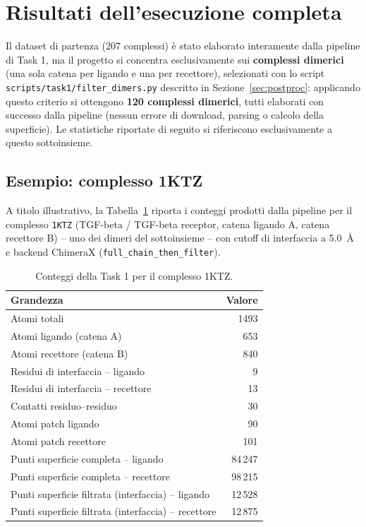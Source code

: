 \documentclass[11pt,a4paper]{article}
\begin{document}
\section{Risultati dell'esecuzione completa}
\label{sec:results}

Il dataset di partenza (207 complessi) è stato elaborato interamente dalla pipeline di Task 1, ma il progetto si concentra esclusivamente sui \textbf{complessi dimerici} (una sola catena per ligando e una per recettore), selezionati con lo script \texttt{scripts/task1/filter\_dimers.py} descritto in Sezione~\ref{sec:postproc}: applicando questo criterio si ottengono \textbf{120 complessi dimerici}, tutti elaborati con successo dalla pipeline (nessun errore di download, parsing o calcolo della superficie). Le statistiche riportate di seguito si riferiscono esclusivamente a questo sottoinsieme.

\subsection{Esempio: complesso 1KTZ}
A titolo illustrativo, la Tabella~\ref{tab:1ktz} riporta i conteggi prodotti dalla pipeline per il complesso \texttt{1KTZ} (TGF-beta / TGF-beta receptor, catena ligando A, catena recettore B) -- uno dei dimeri del sottoinsieme -- con cutoff di interfaccia a 5.0~\r{A} e backend ChimeraX (\texttt{full\_chain\_then\_filter}).

\begin{table}[h]
\centering
\caption{Conteggi della Task 1 per il complesso 1KTZ.}
\label{tab:1ktz}
\begin{tabular}{lr}
\toprule
Grandezza & Valore \\
\midrule
Atomi totali & 1493 \\
Atomi ligando (catena A) & 653 \\
Atomi recettore (catena B) & 840 \\
Residui di interfaccia -- ligando & 9 \\
Residui di interfaccia -- recettore & 13 \\
Contatti residuo--residuo & 30 \\
Atomi patch ligando & 90 \\
Atomi patch recettore & 101 \\
Punti superficie completa -- ligando & 84\,247 \\
Punti superficie completa -- recettore & 98\,215 \\
Punti superficie filtrata (interfaccia) -- ligando & 12\,528 \\
Punti superficie filtrata (interfaccia) -- recettore & 12\,875 \\
\bottomrule
\end{tabular}
\end{table}
\end{document}
